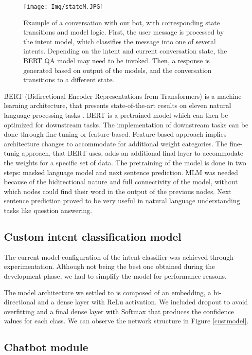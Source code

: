 \documentclass[runningheads,a4paper,11pt]{report}
\begin{document}
\begin{figure}
\centerline{\texttt{[image: Img/stateM.JPG]}}  
	\caption {Example of a conversation with our bot, with corresponding state transitions and model logic. First, the user message is processed by the intent model,
which classifies the message into one of several intents. Depending on the intent and current conversation state, the BERT QA model may need to be invoked. Then, a response is generated based on output of the models, and the conversation transitions to a different state.
}
	\label{stateM}
\end{figure}

BERT (Bidirectional Encoder Representations from Transformers) is a machine learning architecture, that presents state-of-the-art results on eleven natural language processing tasks \cite{bert}. BERT is a pretrained model which can then be optimized for downstream tasks. The implementation of downstream tasks can be done through fine-tuning or feature-based. Feature based approach implies architecture changes to accommodate for additional weight categories. The fine-tunig approach, that BERT uses, adds an additional final layer to accommodate the weights for a specific set of data. The pretraining of the model is done in two steps: masked language model and next sentence prediction. MLM was needed because of the bidirectional nature and full connectivity of the model, without which nodes could find their word in the output of the previous nodes. Next sentence prediction proved to be very useful in natural language understanding tasks like question answering.

\subsection{Custom intent classification model}
\label{section:customModels}

The current model configuration of the intent classifier was achieved through experimentation. Although not being the best one obtained during the development phase, we had to simplify the model for performance reasons. 

The model architecture we settled to is composed of an embedding, a bi-directional and a dense layer with ReLu activation. We included dropout to avoid overfitting and a final dense layer with Softmax that produces the confidence values for each class. We can observe the network structure in Figure \ref{custmodel}.


\subsection{Chatbot module}
\label{section:chatbot}
\end{document}
